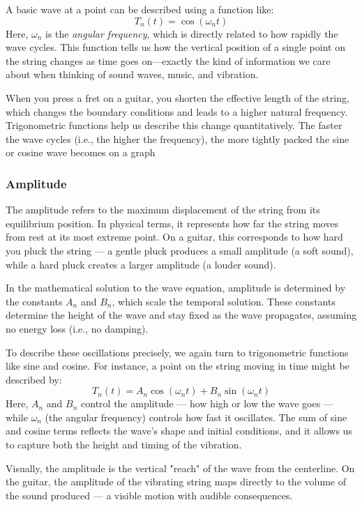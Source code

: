 A basic wave at a point can be described using a function like:
\[
T_n(t) = \cos(\omega_n t)
\]
Here, \( \omega_n \) is the \textit{angular frequency}, which is directly related to how rapidly the wave cycles. This function tells us how the vertical position of a single point on the string changes as time goes on—exactly the kind of information we care about when thinking of sound waves, music, and vibration.

When you press a fret on a guitar, you shorten the effective length of the string, which changes the boundary conditions and leads to a higher natural frequency. Trigonometric functions help us describe this change quantitatively. The faster the wave cycles (i.e., the higher the frequency), the more tightly packed the sine or cosine wave becomes on a graph

    
\subsubsection{Amplitude}

The amplitude refers to the maximum displacement of the string from its equilibrium position. In physical terms, it represents how far the string moves from rest at its most extreme point. On a guitar, this corresponds to how hard you pluck the string — a gentle pluck produces a small amplitude (a soft sound), while a hard pluck creates a larger amplitude (a louder sound).

In the mathematical solution to the wave equation, amplitude is determined by the constants \( A_n \) and \( B_n \), which scale the temporal solution. These constants determine the height of the wave and stay fixed as the wave propagates, assuming no energy loss (i.e., no damping).

To describe these oscillations precisely, we again turn to trigonometric functions like sine and cosine. For instance, a point on the string moving in time might be described by:
\[
T_n(t) = A_n \cos(\omega_n t) + B_n \sin(\omega_n t)
\]
Here, \( A_n \) and \( B_n \) control the amplitude — how high or low the wave goes — while \( \omega_n \) (the angular frequency) controls how fast it oscillates. The sum of sine and cosine terms reflects the wave's shape and initial conditions, and it allows us to capture both the height and timing of the vibration.

Visually, the amplitude is the vertical "reach" of the wave from the centerline. On the guitar, the amplitude of the vibrating string maps directly to the volume of the sound produced — a visible motion with audible consequences.

